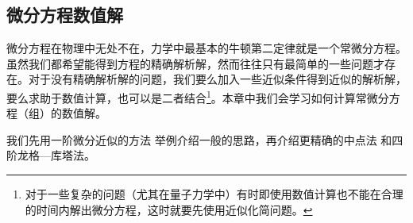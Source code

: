 \subsection{微分方程数值解}
微分方程在物理中无处不在，力学中最基本的牛顿第二定律就是一个常微分方程。虽然我们都希望能得到方程的精确解析解，然而往往只有最简单的一些问题才存在。对于没有精确解析解的问题，我们要么加入一些近似条件得到近似的解析解，要么求助于数值计算，也可以是二者结合\footnote{对于一些复杂的问题（尤其在量子力学中）有时即使用数值计算也不能在合理的时间内解出微分方程，这时就要先使用近似化简问题。}。本章中我们会学习如何计算常微分方程（组）的数值解。

我们先用一阶微分近似的方法 举例介绍一般的思路，再介绍更精确的中点法 和四阶龙格—库塔法。


